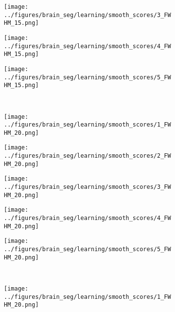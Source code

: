 \begin{figure}[h!]
	\begin{subfigure}{0.16\textwidth}
		\centering
		\texttt{[image: ../figures/brain\_seg/learning/smooth\_scores/3\_FWHM\_15.png]}
		\label{fig:8}
	\end{subfigure}
	\begin{subfigure}{0.16\textwidth}
		\centering
		\texttt{[image: ../figures/brain\_seg/learning/smooth\_scores/4\_FWHM\_15.png]}
		\label{fig:9}
	\end{subfigure}
	\begin{subfigure}{0.16\textwidth}
		\centering
		\texttt{[image: ../figures/brain\_seg/learning/smooth\_scores/5\_FWHM\_15.png]}
		\label{fig:10}
	\end{subfigure}
	\\
	\vspace{-0.35cm}
	\begin{subfigure}{0.16\textwidth}
		\centering
		\texttt{[image: ../figures/brain\_seg/learning/smooth\_scores/1\_FWHM\_20.png]}
		\label{fig:6}
	\end{subfigure}
	\begin{subfigure}{0.16\textwidth}
		\centering
		\texttt{[image: ../figures/brain\_seg/learning/smooth\_scores/2\_FWHM\_20.png]}
		\label{fig:7}
	\end{subfigure}
	\begin{subfigure}{0.16\textwidth}
		\centering
		\texttt{[image: ../figures/brain\_seg/learning/smooth\_scores/3\_FWHM\_20.png]}
		\label{fig:8}
	\end{subfigure}
	\begin{subfigure}{0.16\textwidth}
		\centering
		\texttt{[image: ../figures/brain\_seg/learning/smooth\_scores/4\_FWHM\_20.png]}
		\label{fig:9}
	\end{subfigure}
	\begin{subfigure}{0.16\textwidth}
		\centering
		\texttt{[image: ../figures/brain\_seg/learning/smooth\_scores/5\_FWHM\_20.png]}
		\label{fig:10}
	\end{subfigure}
		\\
	\vspace{-0.35cm}
	\begin{subfigure}{0.16\textwidth}
		\centering
		\texttt{[image: ../figures/brain\_seg/learning/smooth\_scores/1\_FWHM\_20.png]}
		\label{fig:6}
	\end{subfigure}
	\begin{subfigure}{0.16\textwidth}

\end{subfigure}
\end{figure}
